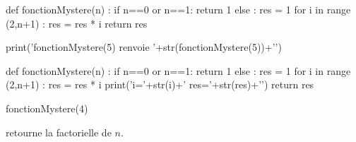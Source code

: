 \begin{minipage}{0.5\textwidth}

\begin{pycode}
def fonctionMystere(n) :
    if n==0 or n==1:
         return 1
    else :
        res = 1
    for i in range (2,n+1) :
        res = res * i
    return res

print('fonctionMystere(5) renvoie '+str(fonctionMystere(5))+'\n')
\end{pycode}
\end{minipage}
\begin{minipage}{0.5\textwidth}

\begin{pycode}
def fonctionMystere(n) :
    if n==0 or n==1:
         return 1
    else :
        res = 1
    for i in range (2,n+1) :
        res = res * i
        print('i='+str(i)+' res='+str(res)+'\n')
    return res

fonctionMystere(4)
\end{pycode}
\end{minipage}





 retourne la factorielle de $n$.